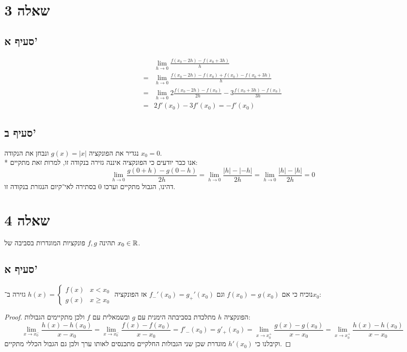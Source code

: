 \section{שאלה 3}
\subsection{סעיף א'}
\begin{align*}
	& \lim_{h \to 0} \frac{f(x_0 - 2h) - f(x_0 + 3h)}{h} \\
	= & \lim_{h \to 0} \frac{f(x_0 - 2h) - f(x_0) + f(x_0) - f(x_0 + 3h)}{h} \\
	= & \lim_{h \to 0} 2 \frac{f(x_0 - 2h) - f(x_0)}{2h} - 3 \frac{ f(x_0 + 3h) - f(x_0)}{3h} \\
	= & 2f'(x_0) - 3f'(x_0) = -f'(x_0)
\end{align*}

\subsection{סעיף ב'}
נגדיר את הפונקציה $g(x) = |x|$ ונבחן את הנקודה $x_0 = 0$. \\*
אנו כבר יודעים כי הפונקציה איננה גזירה בנקודה זו, למרות זאת מתקיים:
\[
	\lim_{h \to 0} \frac{g(0 + h) - g(0 - h)}{2h}
	= \lim_{h \to 0} \frac{|h| - |-h|}{2h}
	= \lim_{h \to 0} \frac{|h| - |h|}{2h}
	= 0
\]
דהינו, הגבול מתקיים וערכו $0$ בסתירה לאי־קיום הנגזרת בנקודה זו.

\section{שאלה 4}
תהינה $f, g$ פונקציות המוגדרות בסביבה של $x_0 \in \mathbb{R}$.

\subsection{סעיף א'}
נוכיח כי אם $f(x_0) = g(x_0)$ וגם $f_-'(x_0) = g_+'(x_0)$ אז הפונקציה $h(x) = \begin{cases}
	f(x) & x < x_0 \\
	g(x) & x \ge x_0
\end{cases}$ גזירה ב־$x_0$:
\begin{proof}
	הפונקציה $h$ מתלכדת בסביבתה הימנית עם $g$ ובשמאלית עם $f$ ולכן מתקיימים הגבולות:
	\[
		\lim_{x \to x_0^-} \frac{h(x) - h(x_0)}{x - x_0}
		= \lim_{x \to x_0^-} \frac{f(x) - f(x_0)}{x - x_0}
		= f'_-(x_0)
		= g'_+(x_0)
		= \lim_{x \to x_0^+} \frac{g(x) - g(x_0)}{x - x_0}
		= \lim_{x \to x_0^+} \frac{h(x) - h(x_0)}{x - x_0}
	\]
	וקיבלנו כי $h'(x_0)$ מוגדרת שכן שני הגבולות החלקיים מתכנסים לאותו ערך ולכן גם הגבול הכללי מתקיים.
\end{proof}


